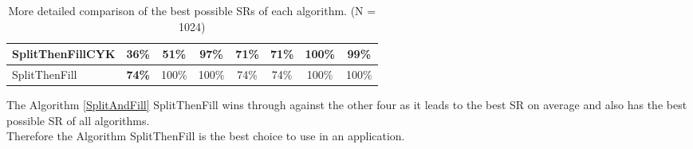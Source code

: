 \begin{table}[h]
\begin{tabular}{|l|c|c|c|c|c|c|c|}
		SplitThenFillCYK                   &\textbf{36\%}    &51\%                                                           &97\%                                                              &71\%      &71\%                                                        &100\%                                                         &99\%                                                           \\ \hline
		SplitThenFill                    &\textbf{74\%}      &100\%                                                           &100\%                                                              &74\%      &74\%                                                        &100\%                                                         &100\%                                                           \\ \hline
	\end{tabular}
	\caption{More detailed comparison of the best possible SRs of each algorithm. (N = 1024)}
	\label{comparisionsAlgorithms}
\end{table}
\noindent The Algorithm \ref{SplitAndFill} SplitThenFill wins through against the other four as it leads to the best SR on average and also has the best possible SR of all algorithms. \\

\noindent Therefore the Algorithm SplitThenFill is the best choice to use in an application.

\clearpage
\pagebreak